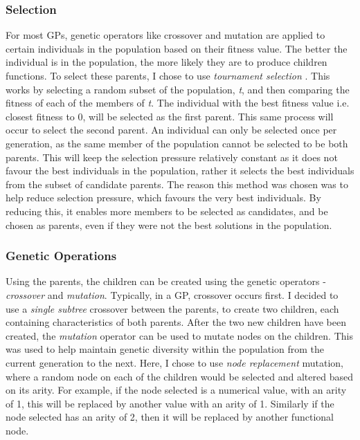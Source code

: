 \documentclass[11pt]{article}
\begin{document}
\subsubsection{Selection}\label{subsubsec:selection}
For most GPs, genetic operators like crossover and mutation are applied to certain individuals in the population based on their fitness value. The better the individual is in the population, the more likely they are to produce children functions. To select these parents, I chose to use \textit{tournament selection} \cite{ref-book}. This works by selecting a random subset of the population, \textit{t}, and then comparing the fitness of each of the members of \textit{t}. The individual with the best fitness value i.e. closest fitness to 0, will be selected as the first parent. This same process will occur to select the second parent. An individual can only be selected once per generation, as the same member of the population cannot be selected to be both parents. This will keep the selection pressure relatively constant as it does not favour the best individuals in the population, rather it selects the best individuals from the subset of candidate parents. The reason this method was chosen was to help reduce selection pressure, which favours the very best individuals. By reducing this, it enables more members to be selected as candidates, and be chosen as parents, even if they were not the best solutions in the population. 
\subsubsection{Genetic Operations}\label{subsubsec:GO}
Using the parents, the children can be created using the genetic operators - \textit{crossover} and \textit{mutation}. Typically, in a GP, crossover occurs first. I decided to use a \textit{single subtree} crossover between the parents, to create two children, each containing characteristics of both parents.
After the two new children have been created, the \textit{mutation} operator can be used to mutate nodes on the children. This was used to help maintain genetic diversity within the population from the current generation to the next. Here, I chose to use \textit{node replacement} mutation, where a random node on each of the children would be selected and altered based on its arity. For example, if the node selected is a numerical value, with an arity of 1, this will be replaced by another value with an arity of 1. Similarly if the node selected has an arity of 2, then it will be replaced by another functional node.
\end{document}
